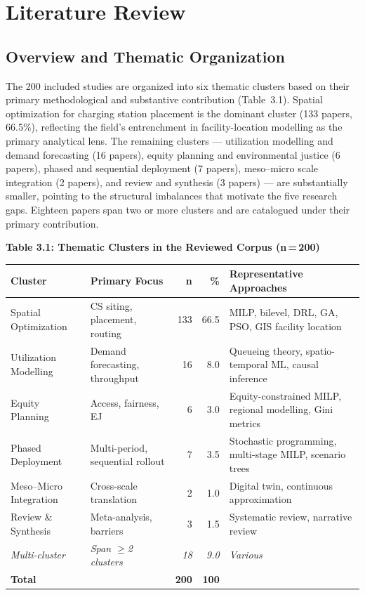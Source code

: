 \documentclass[12pt,letterpaper]{article}
\begin{document}
\section{Literature Review}

\subsection{Overview and Thematic Organization}

The 200 included studies are organized into six thematic clusters based
on their primary methodological and substantive contribution
(Table~3.1).  Spatial optimization for charging station placement is the
dominant cluster (133 papers, 66.5\%), reflecting the field's
entrenchment in facility-location modelling as the primary analytical
lens.  The remaining clusters --- utilization modelling and demand
forecasting (16 papers), equity planning and environmental justice
(6 papers), phased and sequential deployment (7 papers), meso--micro
scale integration (2 papers), and review and synthesis (3 papers) ---
are substantially smaller, pointing to the structural imbalances that
motivate the five research gaps.  Eighteen papers span two or more
clusters and are catalogued under their primary contribution.

\bigskip
\noindent\textbf{Table 3.1: Thematic Clusters in the Reviewed Corpus (n\,=\,200)}

\smallskip
\begin{tabularx}{\textwidth}{@{}p{2.8cm} p{3.0cm} r r X@{}}
  \toprule
  \textbf{Cluster} & \textbf{Primary Focus} & \textbf{n} & \textbf{\%}
    & \textbf{Representative Approaches} \\
  \midrule
  Spatial Optimization
    & CS siting, placement, routing
    & 133 & 66.5
    & MILP, bilevel, DRL, GA, PSO, GIS facility location \\[2pt]
  Utilization Modelling
    & Demand forecasting, throughput
    & 16 & 8.0
    & Queueing theory, spatio-temporal ML, causal inference \\[2pt]
  Equity Planning
    & Access, fairness, EJ
    & 6 & 3.0
    & Equity-constrained MILP, regional modelling, Gini metrics \\[2pt]
  Phased Deployment
    & Multi-period, sequential rollout
    & 7 & 3.5
    & Stochastic programming, multi-stage MILP, scenario trees \\[2pt]
  Meso--Micro Integration
    & Cross-scale translation
    & 2 & 1.0
    & Digital twin, continuous approximation \\[2pt]
  Review \& Synthesis
    & Meta-analysis, barriers
    & 3 & 1.5
    & Systematic review, narrative review \\[2pt]
  \textit{Multi-cluster}
    & \textit{Span $\geq$2 clusters}
    & \textit{18} & \textit{9.0}
    & \textit{Various} \\
  \midrule
  \textbf{Total} & & \textbf{200} & \textbf{100} & \\
  \bottomrule
\end{tabularx}
\end{document}

